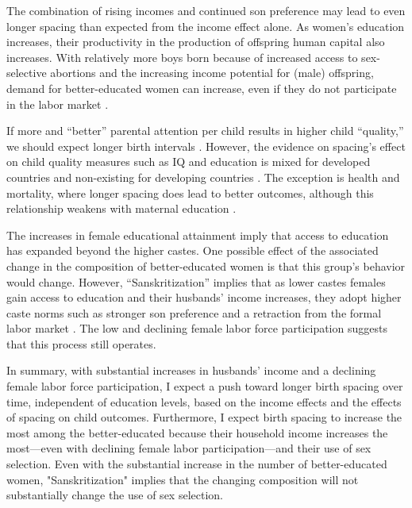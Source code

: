 \documentclass[12pt,letterpaper]{article}
\begin{document}
The combination of rising incomes and continued son preference may lead to even longer 
spacing than expected from the income effect alone.
As women's education increases, their productivity in the production of offspring human 
capital also increases.
With relatively more boys born because of increased access to sex-selective 
abortions and the increasing income potential for (male) offspring, demand for 
better-educated women can increase, even if they do not participate in the labor market 
\citep{Behrman1999}.

If more and ``better'' parental attention per child results in higher child ``quality,'' 
we should expect longer birth intervals \citep{Zajonc1975,Zajonc1976,Razin1980}.
However, the evidence on spacing's effect on child quality measures such as IQ 
and education is mixed for developed countries and non-existing for developing countries
\citep{Powell1993,Pettersson-Lidbom2009,Buckles2012,Barclay2017}.
The exception is health and mortality, where longer spacing does lead to better outcomes, 
although this relationship weakens with maternal education 
\citep{Whitworth2002,Conde-Agudelo2012,Molitoris2019}.



The increases in female educational attainment imply that access to education has 
expanded beyond the higher castes. 
One possible effect of the associated change in the composition of better-educated women 
is that this group's behavior would change.
However, ``Sanskritization'' implies that as lower castes females gain access to 
education and their husbands' income increases, they adopt higher caste 
norms such as stronger son preference and a retraction from the formal labor 
market \citep{Srinivas1956,Chen1995,Abraham2013,Chatterjee2018}.
The low and declining female labor force participation suggests that this process still operates.


In summary, with substantial increases in husbands' income and a declining female labor 
force participation, I expect a push toward longer birth spacing over time, independent
of education levels, based on the income effects and the effects of spacing
on child outcomes.
Furthermore, I expect birth spacing to increase the most among the better-educated 
because their household income increases the most---even with declining female labor 
participation---and their use of sex selection.
Even with the substantial increase in the number of better-educated women, 
"Sanskritization" implies that the changing composition will not substantially change 
the use of sex selection.
\end{document}
